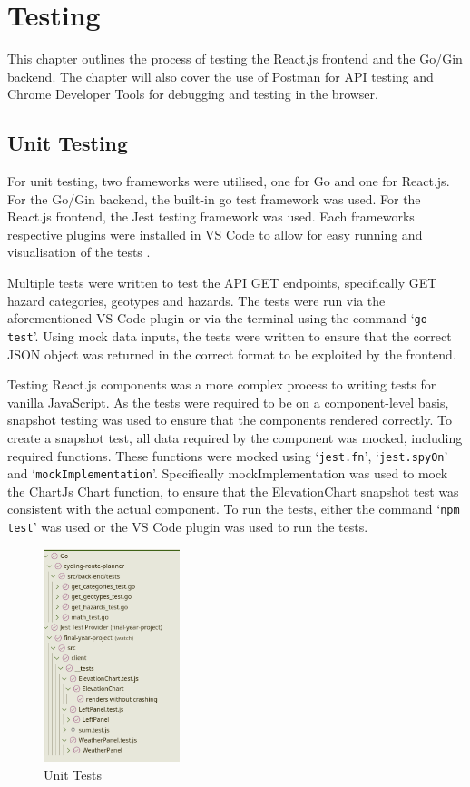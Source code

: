 \chapter{Testing}
\label{chap:testing}

This chapter outlines the process of testing the React.js frontend and the Go/Gin backend. The chapter will also cover the use of Postman for API testing and Chrome Developer Tools for debugging and testing in the browser.

\section{Unit Testing}
\label{testing:unit}

For unit testing, two frameworks were utilised, one for Go and one for React.js. For the Go/Gin backend, the built-in go test framework was used. For the React.js frontend, the Jest testing framework was used. Each frameworks respective plugins were installed in VS Code to allow for easy running and visualisation of the tests .

Multiple tests were written to test the API GET endpoints, specifically GET hazard categories, geotypes and hazards. The tests were run via the aforementioned VS Code plugin or via the terminal using the command `\texttt{go test}'. Using mock data inputs, the tests were written to ensure that the correct JSON object was returned in the correct format to be exploited by the frontend.

Testing React.js components was a more complex process to writing tests for vanilla JavaScript. As the tests were required to be on a component-level basis, snapshot testing was used to ensure that the components rendered correctly. To create a snapshot test, all data required by the component was mocked, including required functions. These functions were mocked using `\texttt{jest.fn}', `\texttt{jest.spyOn}' and `\texttt{mockImplementation}'. Specifically mockImplementation was used to mock the ChartJs Chart function, to ensure that the ElevationChart snapshot test was consistent with the actual component. To run the tests, either the command `\texttt{npm test}' was used or the VS Code plugin was used to run the tests.

\begin{figure}[!ht]
    \centering
    \includegraphics[width=150px]{figures/unit-tests.png}
    \caption{Unit Tests}
    \label{fig:unit-tests}
  \end{figure}

